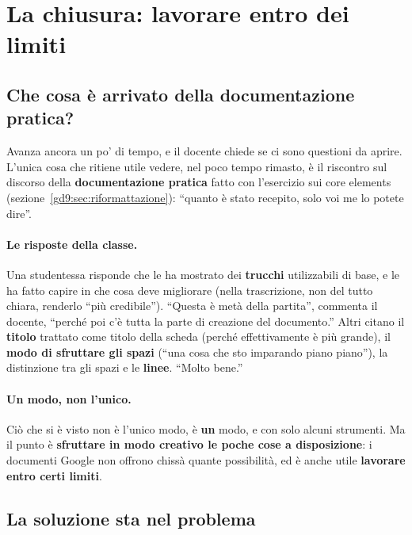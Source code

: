 \section{La chiusura: lavorare entro dei limiti}
\label{gd10:sec:chiusura}

\subsection{Che cosa è arrivato della documentazione pratica?}

Avanza ancora un po' di tempo, e il docente chiede se ci sono questioni da
aprire. L'unica cosa che ritiene utile vedere, nel poco tempo rimasto, è il
riscontro sul discorso della \textbf{documentazione pratica} fatto con
l'esercizio sui core elements (sezione~\ref{gd9:sec:riformattazione}):
``quanto è stato recepito, solo voi me lo potete dire''.

\paragraph{Le risposte della classe.} Una studentessa risponde che le ha
mostrato dei \textbf{trucchi} utilizzabili di base, e le ha fatto capire in
che cosa deve migliorare (nella trascrizione, non del tutto chiara, renderlo ``più credibile'').
``Questa è metà della partita'', commenta il docente, ``perché poi c'è tutta
la parte di creazione del documento.'' Altri citano il \textbf{titolo}
trattato come titolo della scheda (perché effettivamente è più grande), il
\textbf{modo di sfruttare gli spazi} (``una cosa che sto imparando piano
piano''), la distinzione tra gli spazi e le \textbf{linee}. ``Molto bene.''

\paragraph{Un modo, non l'unico.} Ciò che si è visto non è l'unico modo, è
\textbf{un} modo, e con solo alcuni strumenti. Ma il punto è
\textbf{sfruttare in modo creativo le poche cose a disposizione}: i
documenti Google non offrono chissà quante possibilità, ed è anche utile
\textbf{lavorare entro certi limiti}.

\subsection{La soluzione sta nel problema}

